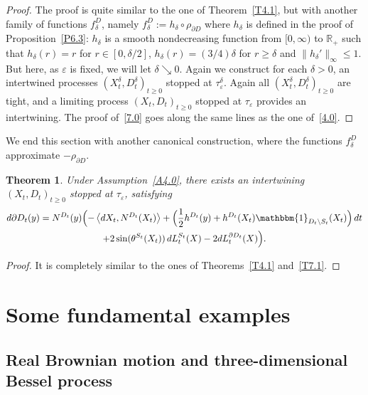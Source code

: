 \documentclass[10pt]{amsart}
\let\backslash\setminus
\theoremstyle{plain}
\newtheorem{thm}{Theorem}[section]
\theoremstyle{definition}
\newcommand{\RR}{{\mathbb R}}
\newcommand{\un}{\mathbbm{1}}
\let\f\frac
\let\d\delta
\let\e\varepsilon
\begin{document}
\begin{proof}
The proof is quite similar to the one of Theorem~\ref{T4.1}, but with another family of functions $f_\d^D$, namely $f_\d^D:=h_\d\circ \rho_{\partial D}$ where $h_\d$ is defined in the proof of Proposition~\ref{P6.3}: $h_\d$ is a smooth nondecreasing function from $[0,\infty)$ to $\RR_+$ such that $h_\d(r)=r$ for $r\in [0,\d/2]$, $h_\d(r)=(3/4)\d$ for $r\ge \d$ and $\|h_\d'\|_\infty\le 1$. But here, as $\e$ is fixed, we will let $\d\searrow 0$. Again we construct for
each $\d>0$, an intertwined processes $(X_t^\d,D_t^\d)_{t\ge 0}$ stopped at $\tau_\e^\d$. Again
all $(X_t^\d,D_t^\d)_{t\ge 0}$ are tight, and a limiting process $(X_t,D_t)_{t\ge 0}$ stopped at $\tau_\e$ provides an intertwining. The proof of~\eqref{7.0} goes along the same lines as the one of~\eqref{4.0}.
\end{proof}

We end this section with another canonical construction, where the functions $f_\d^D$ approximate $-\rho_{\partial D}$.
\begin{thm}
\label{T7.2}
Under Assumption~\ref{A4.0},
there exists an intertwining $(X_t,D_t)_{t\ge0}$ stopped at $\tau_\e$, satisfying
\begin{multline}
d\partial D_t(y)=N^{D_t}(y)\Bigl(-\left\langle dX_t, N^{D_t}(X_t)\right\rangle +\Bigl(\f12 h^{D_t}(y)+h^{D_t}(X_t) \un_{D_t \backslash S_t}(X_t) \Bigr)\,dt\\
+2\sin(\theta^{S_t}(X_t))\, dL_t^{S_t}(X) -2dL_t^{\partial D_t}(X)\Bigr).
\end{multline}
\end{thm}
\begin{proof}
It is completely similar to the ones of Theorems~\ref{T4.1} and~\ref{T7.1}.
\end{proof}
\section{Some fundamental examples}
\label{Section5}

\subsection{Real Brownian motion and three-dimensional Bessel process}
\label{Subsection5.1}
\end{document}
